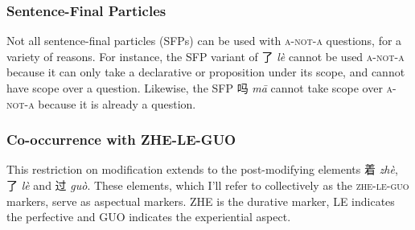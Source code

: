 \documentclass[12pt, UTF8]{article}
\begin{document}
\subsubsection{Sentence-Final Particles}

Not all sentence-final particles (SFPs) can be used with \textsc{a-not-a} questions, for a variety of reasons. For instance, the SFP variant of 了 \textit{l\`{e}} cannot be used \textsc{a-not-a} because it can only take a declarative or proposition under its scope, and cannot have scope over a question. Likewise, the SFP 吗 \textit{m\={a}} cannot take scope over \textsc{a-not-a} because it is already a question.


%

%

\subsubsection{Co-occurrence with ZHE-LE-GUO}

This restriction on modification extends to the post-modifying elements 着 \textit{zh\`{e}}, 了 \textit{l\`{e}} and 过 \textit{gu\`{o}}. These elements, which I'll refer to collectively as the \textsc{zhe-le-guo} markers, serve as aspectual markers. ZHE is the durative marker, LE indicates the perfective and GUO indicates the experiential aspect. 
\end{document}
